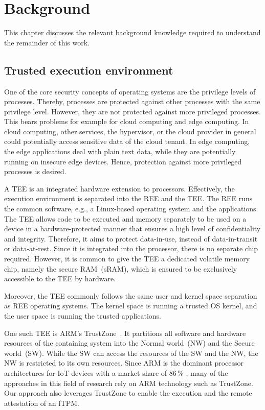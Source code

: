 
\chapter{Background}\label{chapter:background}

This chapter discusses the relevant background knowledge required to understand the remainder of this work.

\section{Trusted execution environment}

One of the core security concepts of operating systems are the privilege levels of processes. Thereby, processes are protected against other processes with the same privilege level. However, they are not protected against more privileged processes. This bears problems for example for cloud computing and edge computing. In cloud computing, other services, the hypervisor, or the cloud provider in general could potentially access sensitive data of the cloud tenant. In edge computing, the edge applications deal with plain text data, while they are potentially running on insecure edge devices. Hence, protection against more privileged processes is desired.

A \ac{TEE} is an integrated hardware extension to processors. Effectively, the execution environment is separated into the \ac{REE} and the \ac{TEE}. The \ac{REE} runs the common software, e.g., a Linux-based operating system and the applications. The TEE allows code to be executed and memory separately to be used on a device in a hardware-protected manner that ensures a high level of confidentiality and integrity. Therefore, it aims to protect data-in-use, instead of data-in-transit or data-at-rest. Since it is integrated into the processor, there is no separate chip required. However, it is common to give the \ac{TEE} a dedicated volatile memory chip, namely the secure RAM~(sRAM), which is ensured to be exclusively accessible to the \ac{TEE} by hardware.

Moreover, the \ac{TEE} commonly follows the same user and kernel space separation as \ac{REE} operating systems. The kernel space is running a trusted OS kernel, and the user space is running the trusted applications.

One such \ac{TEE} is ARM's TrustZone~\cite{ARM09}. It partitions all software and hardware resources of the containing system into the Normal world~(NW) and the Secure world~(SW).
While the SW can access the resources of the SW and the NW, the NW is restricted to its own resources.
Since ARM is the dominant processor architectures for IoT devices with a market share of 86\,\% \cite{eclipse}, many of the approaches in this field of research rely on ARM technology such as TrustZone.
Our approach also leverages TrustZone to enable the execution and the remote attestation of an fTPM.

